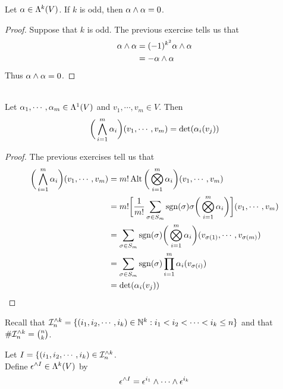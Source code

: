 \documentclass{book}
\begin{document}
	\begin{ex}
		Let $\alpha \in \Lambda^k(V)$. If $k$ is odd, then $\alpha \wedge \alpha = 0$. 
	\end{ex}

	\begin{proof}
		Suppose that $k$ is odd. The previous exercise tells us that 
		\begin{align*}
			\alpha \wedge \alpha 
			&= (-1)^{k^2} \alpha \wedge \alpha \\
			&= -\alpha \wedge \alpha
		\end{align*}
		Thus $\alpha \wedge \alpha = 0$.
	\end{proof}
	
	\begin{ex}\\
		Let $\alpha_1, \cdots, \alpha_m \in \Lambda^1(V)$ and $v_1, \cdots, v_m \in V$. Then $$\bigg( \bigwedge_{i=1}^m \alpha_i \bigg)(v_1, \cdots, v_m) = \det (\alpha_i (v_j))$$
	\end{ex}

	\begin{proof}
		The previous exercises tell us that
		\begin{align*}
			\bigg( \bigwedge_{i=1}^m \alpha_i \bigg)(v_1, \cdots, v_m)
			&= m! \operatorname{Alt} \bigg( \bigotimes_{i=1}^m \alpha_i \bigg) (v_1, \cdots, v_m) \\
			&= m! \bigg[ \frac{1}{m!} \sum_{\sigma \in S_{m}} \operatorname{sgn}(\sigma) \sigma \bigg(\bigotimes_{i=1}^m \alpha_i \bigg) \bigg] (v_1, \cdots, v_m) \\
			&= \sum_{\sigma \in S_{m}} \operatorname{sgn}(\sigma)  \bigg(\bigotimes_{i=1}^m \alpha_i \bigg) (v_{\sigma(1)}, \cdots, v_{\sigma(m)}) \\
			&= \sum_{\sigma \in S_{m}} \operatorname{sgn}(\sigma)  \prod_{i=1}^m \alpha_i(v_{\sigma(i)})   \\
			&= \det (\alpha_i (v_j))
		\end{align*}
	\end{proof}

	\begin{note}
		Recall that $\mathcal{I}_n^{\wedge k} = \{(i_1, i_2, \cdots, i_k) \in \mathbb{N}^k: i_1 < i_2 < \cdots < i_k \leq n \}$ and that $\# \mathcal{I}_n^{\wedge k} = {n \choose k}$. 
	\end{note}

	\begin{defn}
		Let $I = \{(i_1, i_2, \cdots, i_k) \in \mathcal{I}_n^{\wedge k}$. \\ Define $\epsilon^{\wedge I} \in \Lambda^k(V)$ by $$ \epsilon^{\wedge I} = \epsilon^{i_1} \wedge \cdots \wedge \epsilon^{i_k} $$ 
	\end{defn}
\end{document}
